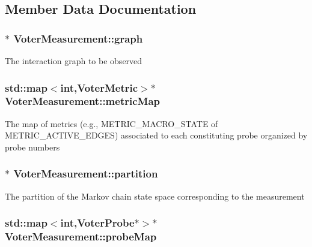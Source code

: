\subsection{Member Data Documentation}
\hypertarget{classVoterMeasurement_a8d22d4b78f7e2f4c747f5716c4885351}{
\subsubsection[{graph}]{$\ast$ Voter\-Measurement\-::graph}}\label{classVoterMeasurement_a8d22d4b78f7e2f4c747f5716c4885351}
The interaction graph to be observed \hypertarget{classVoterMeasurement_a27a9133a8ff11810c10c06b647a3ce85}{
\subsubsection[{metric\-Map}]{\setlength{\rightskip}{0pt plus 5cm}std\-::map$<$int,{\bf Voter\-Metric}$>$$\ast$ Voter\-Measurement\-::metric\-Map}}\label{classVoterMeasurement_a27a9133a8ff11810c10c06b647a3ce85}
The map of metrics (e.\-g., M\-E\-T\-R\-I\-C\-\_\-\-M\-A\-C\-R\-O\-\_\-\-S\-T\-A\-T\-E of M\-E\-T\-R\-I\-C\-\_\-\-A\-C\-T\-I\-V\-E\-\_\-\-E\-D\-G\-E\-S) associated to each constituting probe organized by probe numbers \hypertarget{classVoterMeasurement_aa3879b092c573e4ba4f45531a4f57e5b}{
\subsubsection[{partition}]{$\ast$ Voter\-Measurement\-::partition}}\label{classVoterMeasurement_aa3879b092c573e4ba4f45531a4f57e5b}
The partition of the Markov chain state space corresponding to the measurement \hypertarget{classVoterMeasurement_abdee5af4a48de3334ace791912033e28}{
\subsubsection[{probe\-Map}]{\setlength{\rightskip}{0pt plus 5cm}std\-::map$<$int,{\bf Voter\-Probe}$\ast$$>$$\ast$ Voter\-Measurement\-::probe\-Map}}\label{classVoterMeasurement_abdee5af4a48de3334ace791912033e28}

